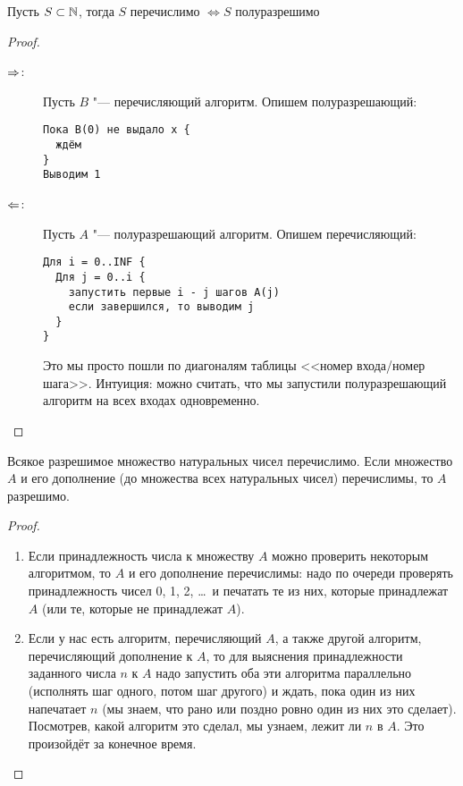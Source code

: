 \begin{theorem}
	Пусть $S \subset \mathbb{N}$, тогда $S$ перечислимо $\iff S$ полуразрешимо
\end{theorem}
\begin{proof}
	\begin{description}
	\item[$\Rightarrow$:]
		Пусть $B$ "--- перечисляющий алгоритм.
		Опишем полуразрешающий:
\begin{verbatim}
Пока B(0) не выдало x {
  ждём
}
Выводим 1
\end{verbatim}
	\item[$\Leftarrow$:]
		Пусть $A$ "--- полуразрешающий алгоритм.
		Опишем перечисляющий:
\begin{verbatim}
Для i = 0..INF {
  Для j = 0..i {
    запустить первые i - j шагов A(j)
    если завершился, то выводим j
  }
}
\end{verbatim}
		Это мы просто пошли по диагоналям таблицы <<номер входа/номер шага>>.
		Интуиция: можно считать, что мы запустили полуразрешающий алгоритм на всех входах одновременно.
	\end{description}
\end{proof}

\begin{theorem}[Поста]\label{postTh}
	Всякое разрешимое множество натуральных чисел перечислимо.
	Если множество $A$ и его дополнение (до множества всех натуральных чисел) перечислимы, то $A$ разрешимо.
\end{theorem}
\begin{proof}
	\begin{enumerate}
	\item
		Если принадлежность числа к множеству $A$ можно проверить некоторым алгоритмом, то $A$ и его дополнение перечислимы:
		надо по очереди проверять принадлежность чисел 0, 1, 2, \dots~и печатать те из них, которые принадлежат $A$ (или те, которые не принадлежат $A$).
	\item
		Если у нас есть алгоритм, перечисляющий $A$, а также другой алгоритм, перечисляющий дополнение к $A$, то для выяснения принадлежности заданного числа $n$
		к $A$ надо запустить оба эти алгоритма параллельно (исполнять шаг одного, потом шаг другого) и ждать, пока один из них напечатает $n$ (мы знаем, что рано или поздно ровно один из них это сделает).
		Посмотрев, какой алгоритм это сделал, мы узнаем, лежит ли $n$ в $A$.
		Это произойдёт за конечное время.
	\end{enumerate}
\end{proof}

